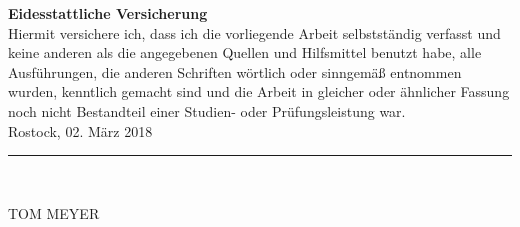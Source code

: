 \documentclass[	english,
    ]{WissTemplate}
\renewcommand{\name}{TOM MEYER}
\begin{document}

\frontmatter

\tableofcontents
\newpage
\markright{\nomname}
\printnomenclature
{}
\mainmatter












% 

\newpage
\thispagestyle{empty}
\label{EidesstattlicheVersicherung}
\vspace*{8cm}%
{\parindent 0pt
    \textbf{\Huge{Eidesstattliche Versicherung}}\vspace{10mm}\\
    Hiermit versichere ich, dass ich die vorliegende Arbeit selbstständig verfasst und keine anderen als die angegebenen Quellen und Hilfsmittel benutzt habe, alle Ausführungen, die anderen Schriften wörtlich oder sinngemäß entnommen wurden, kenntlich gemacht sind und die Arbeit in gleicher oder ähnlicher Fassung noch nicht Bestandteil einer Studien- oder Prüfungsleistung war.
    \\[2cm]}
Rostock, 02. März 2018
\\[3cm]
\rule{6cm}{0.5pt}\\
\parbox[l][1cm][c]{6cm}{\hfill\name\hfill\vbox{}}
\end{document}
